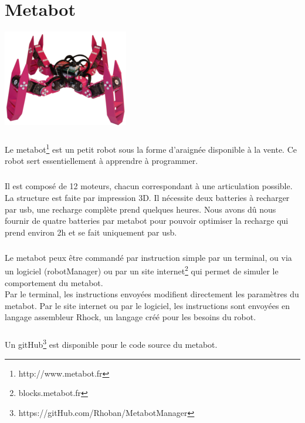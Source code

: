 \documentclass[10pt,a4paper]{report}
\begin{document}
\chapter{Metabot}
\begin{center}
\includegraphics[scale=0.5]{image/metabot.jpg}
\end{center}

\paragraph{}
Le metabot\footnote{http://www.metabot.fr} est un petit robot sous la forme d'araignée disponible à la vente. Ce robot sert essentiellement à apprendre à programmer.
\paragraph{}
Il est composé de 12 moteurs, chacun correspondant à une articulation possible. La structure est faite par impression 3D. 
Il nécessite deux batteries à recharger par usb, une recharge complète prend quelques heures. Nous avons dû nous fournir de quatre batteries par metabot pour pouvoir optimiser la recharge qui prend environ 2h et se fait uniquement par usb.
\paragraph{}
Le metabot peux être commandé par instruction simple par un terminal, ou via un logiciel (robotManager) ou par un site internet\footnote{blocks.metabot.fr} qui permet de simuler le comportement du metabot.
\\
Par le terminal, les instructions envoyées modifient directement les paramètres du metabot. Par le site internet ou par le logiciel, les instructions sont envoyées en langage assembleur Rhock, un langage créé pour les besoins du robot.
\paragraph{}
Un  gitHub\footnote{https://gitHub.com/Rhoban/MetabotManager} est disponible pour le code source du metabot.
\end{document}
